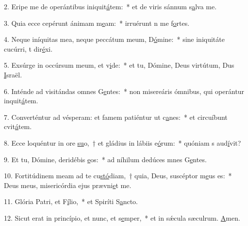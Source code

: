 2. Eripe me de operántibus iniquit\uline{á}tem:~* et de viris sánnum s\uline{a}lva me.\par 
3. Quia ecce cepérunt ánimam m\uline{e}am:~* irruérunt n me f\uline{o}rtes.\par 
4. Neque iníquitas mea, neque peccátum meum, D\uline{ó}mine:~* sine iniquitáte cucúrri, t dir\uline{é}xi.\par 
5. Exsúrge in occúrsum meum, et v\uline{i}de:~* et tu, Dómine, Deus virtútum, Dus \uline{I}sraël.\par 
6. Inténde ad visitándas omnes G\uline{e}ntes:~* non misereáris ómnibus, qui operántur inquit\uline{á}tem.\par 
7. Converténtur ad vésperam: et famem patiéntur ut c\uline{a}nes:~* et circuíbunt cvit\uline{á}tem.\par 
8. Ecce loquéntur in ore \uline{su}o,~† et gládius in lábiis e\uline{ó}rum:~* quóniam s aud\uline{í}vit?\par 
9. Et tu, Dómine, deridébis \uline{e}os:~* ad níhilum dedúces mnes G\uline{e}ntes.\par 
10. Fortitúdinem meam ad te cu\uline{stó}diam,~† quia, Deus, suscéptor m\uline{e}us es:~* Deus meus, misericórdia ejus prævni\uline{e}t me.\par 
11. Glória Patri, et F\uline{í}lio,~* et Spiríti S\uline{a}ncto.\par 
12. Sicut erat in princípio, et nunc, et s\uline{e}mper,~* et in sǽcula sæculrum. \uline{A}men.\par 
